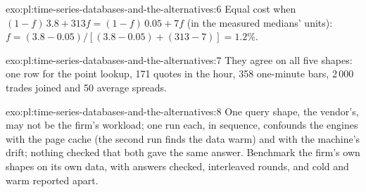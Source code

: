 \begin{solution}{exo:pl:time-series-databases-and-the-alternatives:6}
Equal cost when $(1-f)\,3.8 + 313 f = (1-f)\,0.05 + 7 f$ (in the measured medians' units): $f = (3.8-0.05)/[(3.8-0.05) +
(313-7)] = 1.2\%$.
\end{solution}

\begin{solution}{exo:pl:time-series-databases-and-the-alternatives:7}
They agree on all five shapes: one row for the point lookup, 171 quotes in the hour, 358 one-minute bars, 2\,000 trades joined and
50 average spreads.
\end{solution}

\begin{solution}{exo:pl:time-series-databases-and-the-alternatives:8}
One query shape, the vendor's, may not be the firm's workload; one run each, in sequence, confounds the engines with the page cache
(the second run finds the data warm) and with the machine's drift; nothing checked that both gave the same answer. Benchmark the
firm's own shapes on its own data, with answers checked, interleaved rounds, and cold and warm reported apart.
\end{solution}

